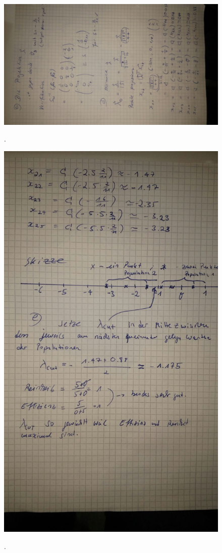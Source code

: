 \FloatBarrier
\begin{figure}
  \centering
  \includegraphics[width=\textwidth]{bild5.jpeg}
  \caption{}.
  \label{fig:5}
\end{figure}
\FloatBarrier

\FloatBarrier
\begin{figure}
  \centering
  \includegraphics[width=\textwidth]{bild6.jpeg}
  \caption{}.
  \label{fig:6}
\end{figure}
\FloatBarrier
